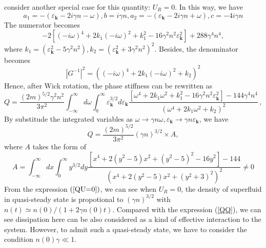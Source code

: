 \documentclass[aps,onecolumn,superscriptaddress,notitlepage,longbibliography]{revtex4-1}
\begin{document}
consider another special case for this quantity: $U_R = 0$. In this way, we
have
\begin{equation}
  a_1 = - (\varepsilon_{\mathbf{k}} - 2 i \gamma n - \omega), b = i
  \gamma n, a_2 = - (\varepsilon_{\mathbf{k}} - 2 i \gamma n + \omega),
  c = - 4 i \gamma n
\end{equation}
The numerator becomes
\begin{equation}
  - 2 [(-i\omega)^4 + 2 k_1 (-i\omega)^2 + k_1^2 - 16 \gamma^2 n^2
  \varepsilon^2_{\mathbf{k}}] + 288 \gamma^4 n^4,
\end{equation}
where $k_1 = (\varepsilon^2_{\mathbf{k}} - 5 \gamma^2 n^2), k_2 =
(\varepsilon^2_{\mathbf{k}} + 3 \gamma^2 n^2)^2$. Besides, the denominator
becomes
\begin{equation}
  | G^{- 1} |^2 = ((-i\omega)^4 + 2 k_1 (-i\omega)^2 + k_2)^2
\end{equation}
Hence, after Wick rotation, the phase stiffness can be rewritten as
\begin{equation}
  Q = \frac{(2 m)^{5 / 2} \gamma^2 n^2}{3 \pi^2} \int_{- \infty}^{\infty} d
  \omega \int_0^{\infty} \varepsilon_{\mathbf{k}}^{3 / 2} d
  \varepsilon_{\mathbf{k}} \frac{[\omega^4 + 2 k_1 \omega^2 + k_1^2 - 16
  \gamma^2 n^2 \varepsilon^2_{\mathbf{k}}] - 144 \gamma^4 n^4}{(\omega^4 + 2
  k_1 \omega^2 + k_2)^2} \,,
\end{equation}
By substitude the integrated variables as $\omega \rightarrow \gamma n \omega,
\varepsilon_{\mathbf{k}} \rightarrow \gamma n \varepsilon_{\mathbf{k}}$,
we have
\begin{equation}
  Q = \frac{(2 m)^{5 / 2}}{3 \pi^2} (\gamma n)^{3 / 2} \times A, \label{QU=0}
\end{equation}
where $A$ takes the form of
\begin{equation}
  A = \int_{- \infty}^{\infty} d x \int_0^{\infty} y^{3 / 2} d y \frac{[x^4 +
  2 (y^2 - 5) x^2 + (y^2 - 5)^2 - 16 y^2] - 144}{(x^4 + 2 (y^2 - 5) x^2 + (y^2
  + 3)^2)^2} \neq 0
\end{equation}
From the expression $\left( \ref{QU=0} \right)$, we can see when $U_R = 0$,
the density of superfluid in quasi-steady state is propotional to $(\gamma
n)^{3 / 2}$ with $n (t) \simeq n (0) / (1 + 2 \gamma n (0) t)$. Compared with
the expression (\ref{QQ}), we can see dissipation here can be also considered
as a kind of effective interaction to the system. However, to admit such a
quasi-steady state, we have to consider the condition $n (0) \gamma \ll 1$.
\end{document}
